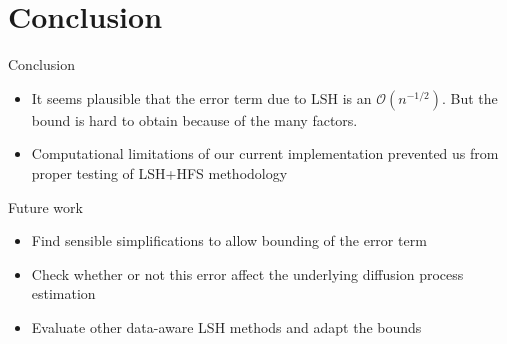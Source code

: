 \documentclass[11pt)]{beamer}
\begin{document}
\section{Conclusion}
\begin{frame}{Conclusion}
\begin{itemize}
\item It seems plausible that the error term due to LSH is an $\mathcal{O}(n^{-1/2})$. But the bound is hard to obtain because of the many factors.
\item Computational limitations of our current implementation prevented us from proper testing of LSH+HFS methodology
\end{itemize}
\end{frame}

\begin{frame}{Future work}
\begin{itemize}
 
 \item Find sensible simplifications to allow bounding of the error term
 \item Check whether or not this error affect the underlying diffusion process estimation
 \item Evaluate other data-aware LSH methods and adapt the bounds
\end{itemize}
\end{frame}
\end{document}
